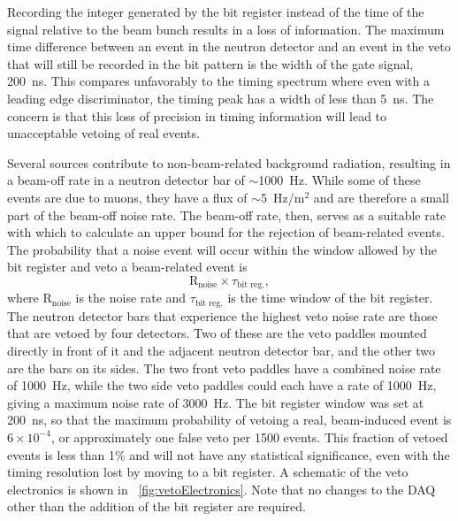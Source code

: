 Recording the integer generated by the bit register instead of the time of the signal relative to the beam bunch results in a loss of information.  The maximum time difference between an event in the neutron detector and an event in the veto that will still be recorded in the bit pattern is the width of the gate signal, 200~ns.  This compares unfavorably to the timing spectrum where even with a leading edge discriminator, the timing peak has a width of less than 5~ns.  The concern is that this loss of precision in timing information will lead to unacceptable vetoing of real events.  

Several sources contribute to non-beam-related background radiation, resulting in a beam-off rate in a neutron detector bar of $\sim$1000~Hz.  While some of these events are due to muons, they have a flux of $\sim$5~Hz/m$^2$ \cite{PDG} and are therefore a small part of the beam-off noise rate.  The beam-off rate, then, serves as a suitable rate with which to calculate an upper bound for the rejection of beam-related events.  The probability that a noise event will occur within the window allowed by the bit register and veto a beam-related event is
\begin{equation}
\text{R}_{\text{noise}}\times\tau_{\text{bit reg.}},
\end{equation}
where $\text{R}_{\text{noise}}$ is the noise rate and $\tau_{\text{bit reg.}}$ is the time window of the bit register.  The neutron detector bars that experience the highest veto noise rate are those that are vetoed by four detectors.  Two of these are the veto paddles mounted directly in front of it and the adjacent neutron detector bar, and the other two are the bars on its sides.  The two front veto paddles have a combined noise rate of 1000~Hz, while the two side veto paddles could each have a rate of 1000~Hz, giving a maximum noise rate of 3000~Hz.   The bit register window was set at 200~ns, so that the maximum probability of vetoing a real, beam-induced event is $6\times10^{-4}$, or approximately one false veto per 1500 events.  This fraction of vetoed events is less than 1\% and will not have any statistical significance, even with the timing resolution lost by moving to a bit register.  A schematic of the veto electronics is shown in {\fig}~\ref{fig:vetoElectronics}.  Note that no changes to the DAQ other than the addition of the bit register are required.
